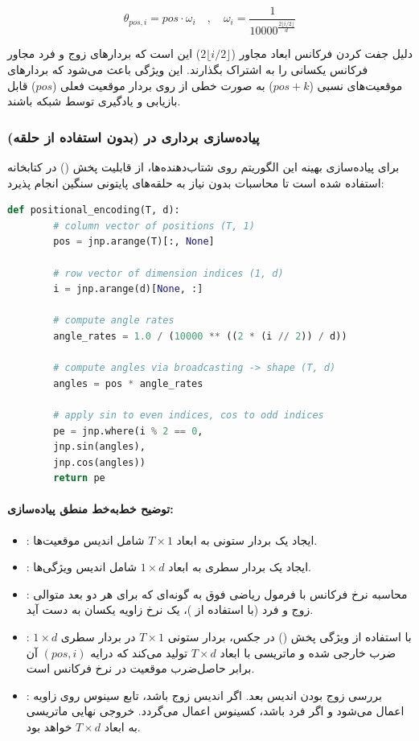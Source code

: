 \documentclass{article}
\begin{document}
\[
\theta_{pos, i} = pos \cdot \omega_i \quad , \quad \omega_i = \frac{1}{10000^{\frac{2 \lfloor i/2 \rfloor}{d}}}
\]

دلیل جفت کردن فرکانس ابعاد مجاور ($2 \lfloor i/2 \rfloor$) این است که بردارهای زوج و فرد مجاور فرکانس یکسانی را به اشتراک بگذارند. این ویژگی باعث می‌شود که بردارهای موقعیت‌های نسبی ($pos + k$) به صورت خطی از روی بردار موقعیت فعلی ($pos$) قابل بازیابی و یادگیری توسط شبکه باشند.

\subsubsection*{پیاده‌سازی برداری در  (بدون استفاده از حلقه)}

برای پیاده‌سازی بهینه این الگوریتم روی شتاب‌دهنده‌ها، از قابلیت پخش () در کتابخانه  استفاده شده است تا محاسبات بدون نیاز به حلقه‌های پایتونی سنگین انجام پذیرد:

\begin{latin}
	\begin{lstlisting}[language=Python, basicstyle=\ttfamily\scriptsize]
		def positional_encoding(T, d):
		# column vector of positions (T, 1)
		pos = jnp.arange(T)[:, None]
		
		# row vector of dimension indices (1, d)
		i = jnp.arange(d)[None, :]
		
		# compute angle rates
		angle_rates = 1.0 / (10000 ** ((2 * (i // 2)) / d))
		
		# compute angles via broadcasting -> shape (T, d)
		angles = pos * angle_rates
		
		# apply sin to even indices, cos to odd indices
		pe = jnp.where(i % 2 == 0,
		jnp.sin(angles),
		jnp.cos(angles))
		return pe
	\end{lstlisting}
\end{latin}

\paragraph{توضیح خط‌به‌خط منطق پیاده‌سازی:}
\begin{itemize}
	\item {}: ایجاد یک بردار ستونی به ابعاد $T \times 1$ شامل اندیس موقعیت‌ها.
	\item {}: ایجاد یک بردار سطری به ابعاد $1 \times d$ شامل اندیس ویژگی‌ها.
	\item {}: محاسبه نرخ فرکانس با فرمول ریاضی فوق به گونه‌ای که برای هر دو بعد متوالی زوج و فرد (با استفاده از )، یک نرخ زاویه یکسان به دست آید.
	\item {}: با استفاده از ویژگی پخش () در جکس، بردار ستونی $T \times 1$ در بردار سطری $1 \times d$ ضرب خارجی شده و ماتریسی با ابعاد $T \times d$ تولید می‌کند که درایه $(pos, i)$ آن برابر حاصل‌ضرب موقعیت در نرخ فرکانس است.
	\item {}: بررسی زوج بودن اندیس بعد. اگر اندیس زوج باشد، تابع سینوس روی زاویه اعمال می‌شود و اگر فرد باشد، کسینوس اعمال می‌گردد. خروجی نهایی ماتریسی به ابعاد $T \times d$ خواهد بود.
\end{itemize}
\end{document}
